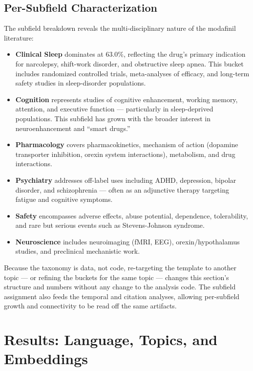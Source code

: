 \documentclass[
  english,
]{article}
\begin{document}
\subsection{Per-Subfield
Characterization}\label{per-subfield-characterization}

The subfield breakdown reveals the multi-disciplinary nature of the
modafinil literature:

\begin{itemize}
\item
  \textbf{Clinical Sleep} dominates at 63.0\%, reflecting the drug's
  primary indication for narcolepsy, shift-work disorder, and
  obstructive sleep apnea. This bucket includes randomized controlled
  trials, meta-analyses of efficacy, and long-term safety studies in
  sleep-disorder populations.
\item
  \textbf{Cognition} represents studies of cognitive enhancement,
  working memory, attention, and executive function --- particularly in
  sleep-deprived populations. This subfield has grown with the broader
  interest in neuroenhancement and ``smart drugs.''
\item
  \textbf{Pharmacology} covers pharmacokinetics, mechanism of action
  (dopamine transporter inhibition, orexin system interactions),
  metabolism, and drug interactions.
\item
  \textbf{Psychiatry} addresses off-label uses including ADHD,
  depression, bipolar disorder, and schizophrenia --- often as an
  adjunctive therapy targeting fatigue and cognitive symptoms.
\item
  \textbf{Safety} encompasses adverse effects, abuse potential,
  dependence, tolerability, and rare but serious events such as
  Stevens-Johnson syndrome.
\item
  \textbf{Neuroscience} includes neuroimaging (fMRI, EEG),
  orexin/hypothalamus studies, and preclinical mechanistic work.
\end{itemize}

Because the taxonomy is data, not code, re-targeting the template to
another topic --- or refining the buckets for the same topic --- changes
this section's structure and numbers without any change to the analysis
code. The subfield assignment also feeds the temporal and citation
analyses, allowing per-subfield growth and connectivity to be read off
the same artifacts.

\newpage

\section{Results: Language, Topics, and
Embeddings}\label{results-language-topics-and-embeddings}
\end{document}
